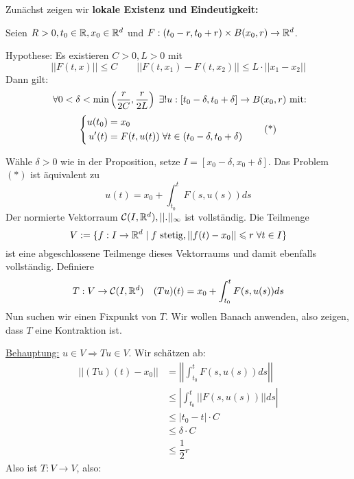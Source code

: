 \documentclass[main.tex]{subfiles}
\begin{document}
\begin{Beweis}
  Zunächst zeigen wir \textbf{lokale Existenz und Eindeutigkeit:}
  \begin{Theorem}
    Seien $R > 0, t_0 \in \mathbb{R}, x_0 \in \mathbb{R}^d$ und $F: (t_0 -r,t_0+r) \times B(x_0,r) \to \mathbb{R}^d$.

    Hypothese: Es existieren $C > 0, L > 0$ mit
    $$||F(t,x)|| \leq C \qquad ||F(t, x_1) - F(t,x_2)|| \leq L \cdot ||x_1 -x_2||$$
    Dann gilt:
    $$\;\forall 0 < \delta < \min\left(\frac{r}{2C},\frac{r}{2L}\right) \;\exists! u:[t_0 - \delta,t_0 + \delta] \to B(x_0,r) \text{ mit:}$$
    \begin{equation*}
      \left\{ \begin{aligned}
        u(t_0) & = x_0 \\
        u'(t) & = F(t,u(t)) \;\forall t \in (t_0 - \delta, t_0 + \delta)
      \end{aligned}\right. \tag{*}
    \end{equation*}
  \end{Theorem}
  \begin{Beweis}
    Wähle $\delta > 0$ wie in der Proposition, setze $I = [x_0 - \delta, x_0 + \delta]$. Das Problem $(*)$ ist äquivalent zu
    $$u(t) = x_0 +\int_{t_0}^t F(s,u(s))ds$$
    Der normierte Vektorraum $\mathcal{C}(I, \mathbb{R}^d),||.||_\infty$ ist vollständig. Die Teilmenge
    $$V := \{f: I \to \mathbb{R}^d \mid f \text{ stetig}, ||f(t) - x_0|| \leqslant r \;\forall t \in I\}$$
    ist eine abgeschlossene Teilmenge dieses Vektorraums und damit ebenfalls vollständig. Definiere
    $$T: V \to \mathcal{C}(I, \mathbb{R}^d) \quad (Tu)(t) = x_0 + \int_{t_0}^t F(s,u(s))ds$$
    Nun suchen wir einen Fixpunkt von $T$. Wir wollen Banach anwenden, also zeigen, dass $T$ eine Kontraktion ist.

    \underline{Behauptung:} $u \in V \Rightarrow Tu \in V$. Wir schätzen ab:
    $$\begin{aligned}
      ||(Tu)(t) - x_0 || & = \left|\left|\int_{t_0}^t F(s,u(s))ds \right|\right| \\
      & \leq \left|\int_{t_0}^t ||F(s,u(s))|| ds \right| \\
      & \leq |t_0 - t| \cdot C \\
      & \leq \delta \cdot C \\
      & \leq \dfrac{1}{2} r
    \end{aligned}$$
    Also ist $T: V \to V$, also:


\end{Beweis}
\end{Beweis}
\end{document}
